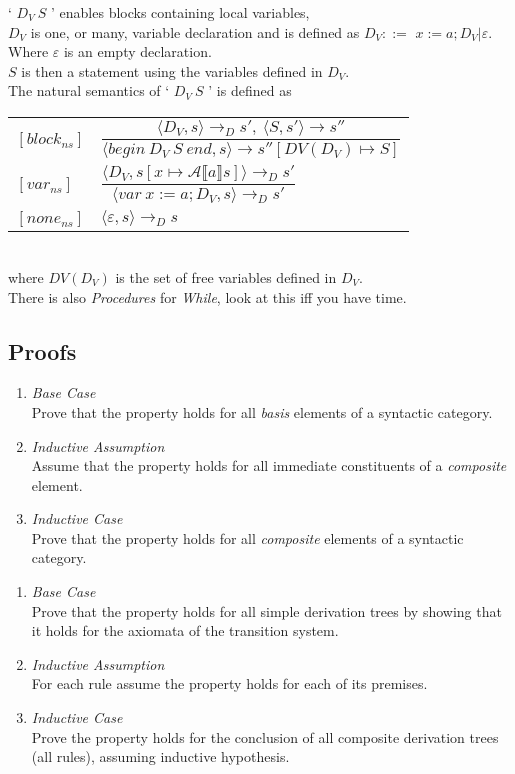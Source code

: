 \documentclass[11pt,a4paper]{article}
\begin{document}
`{} $D_V\ S$ {}' enables blocks containing local variables,\\
$D_V$ is one, or many, variable declaration and is defined as $D_V::=${} $x:=a;D_V|\varepsilon$. Where $\varepsilon$ is an empty declaration.\\
$S$ is then a statement using the variables defined in $D_V$.\\
The natural semantics of `{} $D_V\ S$ {}' is defined as\\
\begin{tabular}{ll}
$[block_{ns}]$&$\dfrac{\langle D_V,s\rangle\to_D s',\ \langle S,s'\rangle\to s''}{\langle begin\ D_V\ S\ end,s\rangle\to s''[DV(D_V)\mapsto S]}$\\
$[var_{ns}]$&$\dfrac{\langle D_V,s[x\mapsto\mathcal{A}\llbracket  a\rrbracket s]\rangle\to_D s'}{\langle var\ x:=a;D_V,s\rangle\to_D s'}$\\
$[none_{ns}]$&$\langle\varepsilon,s\rangle\to_D s$
\end{tabular}\\
where $DV(D_V)$ is the set of free variables defined in $D_V$.\\

\NB There is also \textit{Procedures} for \textit{While}, look at this iff you have time.\\

\subsection{Proofs}

\begin{enumerate}
	\item \textit{Base Case}\\Prove that the property holds for all \textit{basis} elements of a syntactic category.
	\item \textit{Inductive Assumption}\\Assume that the property holds for all immediate constituents of a \textit{composite} element.
	\item \textit{Inductive Case}\\Prove that the property holds for all \textit{composite} elements of a syntactic category.
\end{enumerate}

\begin{enumerate}
	\item \textit{Base Case}\\Prove that the property holds for all simple derivation trees by showing that it holds for the axiomata of the transition system.
	\item \textit{Inductive Assumption}\\For each rule assume the property holds for each of its premises.
	\item \textit{Inductive Case}\\Prove the property holds for the conclusion of all composite derivation trees (\ie all rules), assuming inductive hypothesis.
\end{enumerate}
\end{document}
